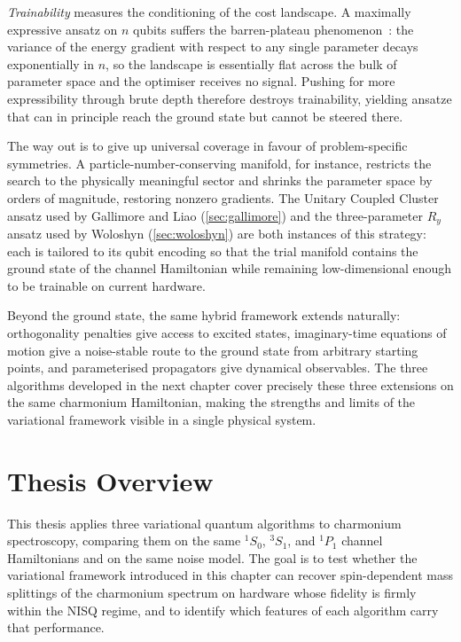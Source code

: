 \emph{Trainability} measures the conditioning of the cost landscape.
A maximally expressive ansatz on $n$ qubits suffers the barren-plateau
phenomenon~\cite{mcclean2018,cerezo2021}: the variance of the energy
gradient with respect to any single parameter decays exponentially in $n$,
so the landscape is essentially flat across the bulk of parameter space
and the optimiser receives no signal. Pushing for more expressibility
through brute depth therefore destroys trainability, yielding ansatze
that can in principle reach the ground state but cannot be steered there.

The way out is to give up universal coverage in favour of
problem-specific symmetries. A particle-number-conserving manifold, for
instance, restricts the search to the physically meaningful sector and
shrinks the parameter space by orders of magnitude, restoring nonzero
gradients. The Unitary Coupled Cluster ansatz used by Gallimore and Liao
(\cref{sec:gallimore}) and the three-parameter $R_y$ ansatz used by
Woloshyn (\cref{sec:woloshyn}) are both instances of this strategy: each
is tailored to its qubit encoding so that the trial manifold contains
the ground state of the channel Hamiltonian while remaining
low-dimensional enough to be trainable on current hardware.

Beyond the ground state, the same hybrid framework extends naturally:
orthogonality penalties give access to excited states, imaginary-time
equations of motion give a noise-stable route to the ground state from
arbitrary starting points, and parameterised propagators give dynamical
observables. The three algorithms developed in the next chapter cover
precisely these three extensions on the same charmonium Hamiltonian,
making the strengths and limits of the variational framework visible in
a single physical system.


\section{Thesis Overview}
\label{sec:overview}

This thesis applies three variational quantum algorithms to charmonium
spectroscopy, comparing them on the same ${}^1S_0$, ${}^3S_1$, and
${}^1P_1$ channel Hamiltonians and on the same noise model. The goal is
to test whether the variational framework introduced in this chapter can
recover spin-dependent mass splittings of the charmonium spectrum on
hardware whose fidelity is firmly within the NISQ regime, and to
identify which features of each algorithm carry that performance.

